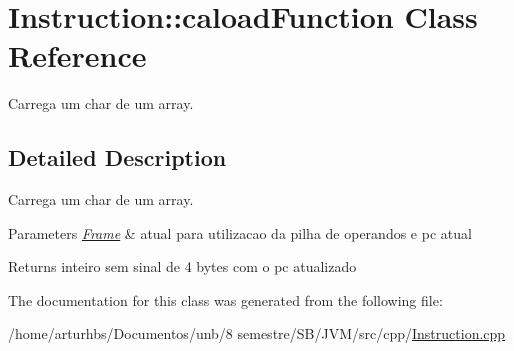 \hypertarget{classInstruction_1_1caloadFunction}{}\section{Instruction\+:\+:caload\+Function Class Reference}
\label{classInstruction_1_1caloadFunction}


Carrega um char de um array.  




\subsection{Detailed Description}
Carrega um char de um array. 


\begin{DoxyParams}{Parameters}
{\em \hyperlink{classFrame}{Frame}} & atual para utilizacao da pilha de operandos e pc atual \\
\hline
\end{DoxyParams}
\begin{DoxyReturn}{Returns}
inteiro sem sinal de 4 bytes com o pc atualizado 
\end{DoxyReturn}


The documentation for this class was generated from the following file\+:\begin{DoxyCompactItemize}
\item 
/home/arturhbs/\+Documentos/unb/8 semestre/\+S\+B/\+J\+V\+M/src/cpp/\hyperlink{Instruction_8cpp}{Instruction.\+cpp}\end{DoxyCompactItemize}
